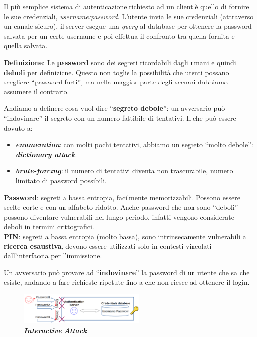 \begin{flushleft}
    Il più semplice sistema di autenticazione richiesto ad un client è quello di fornire le sue credenziali, \textit{username:password}. L'utente invia le sue credenziali (attraverso un canale sicuro), il server esegue una \textit{query} al database per ottenere la password salvata per un certo username e poi effettua il confronto tra quella fornita e quella salvata.

    \smallskip

    \textbf{Definizione}: Le \textbf{password} sono dei segreti ricordabili dagli umani e quindi \textbf{deboli} per definizione. Questo non toglie la possibilità che utenti possano scegliere ``password forti'', ma nella maggior parte degli scenari dobbiamo assumere il contrario.

    \smallskip

    Andiamo a definere cosa vuol dire ``\textbf{segreto debole}'': un avversario può ``indovinare'' il segreto con un numero fattibile di tentativi. Il che può essere dovuto a:
    \begin{itemize}[nosep]
        \item \textbf{\textit{enumeration}}: con molti pochi tentativi, abbiamo un segreto ``molto debole'': \textbf{\textit{dictionary attack}}.
        \item \textbf{\textit{brute-forcing}}: il numero di tentativi diventa non trascurabile, numero limitato di password possibili.
    \end{itemize}

    \smallskip

    \textbf{Password}: segreti a bassa entropia, facilmente memorizzabili. Possono essere scelte corte e con un alfabeto ridotto. Anche password che non sono ``deboli'' possono diventare vulnerabili nel lungo periodo, infatti vengono considerate deboli in termini crittografici. \\
    \textbf{PIN}: segreti a bassa entropia (molto bassa), sono intrinsecamente vulnerabili a \textbf{ricerca esaustiva}, devono essere utilizzati solo in contesti vincolati dall'interfaccia per l'immissione.

    \medskip

    Un avversario può provare ad ``\textbf{indovinare}'' la password di un utente che sa che esiste, andando a fare richieste ripetute fino a che non riesce ad ottenere il login. 

    \begin{figure}[h]
        \centering
        \includegraphics[width=0.55\textwidth]{img/int_attack.png}
        \caption{\textbf{\textit{Interactive Attack}}}
    \end{figure}


\end{flushleft}
